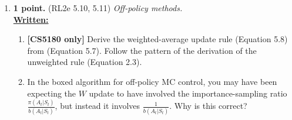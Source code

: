 \documentclass{article}
\newcommand{\solnewpage}{\newpage}
\newcommand{\solnewpage}{}
\begin{document}
\begin{enumerate}
	\item \textbf{1 point.} (RL2e 5.10, 5.11) \textit{Off-policy methods.} \\
	      \uline{\textbf{Written:}}
	      \begin{enumerate}
		      \item \textbf{[CS5180 only]} Derive the weighted-average update rule (Equation 5.8) from (Equation 5.7). Follow the pattern of the derivation of the unweighted rule (Equation 2.3).

		      \item In the boxed algorithm for off-policy MC control, you may have been expecting the $W$ update to have involved the importance-sampling ratio $\frac{\pi(A_t | S_t)}{b(A_t | S_t)}$, but instead it involves $\frac{1}{b(A_t | S_t)}$. Why is this correct? %
	      \end{enumerate}

	      \solnewpage


\end{enumerate}
\end{document}
